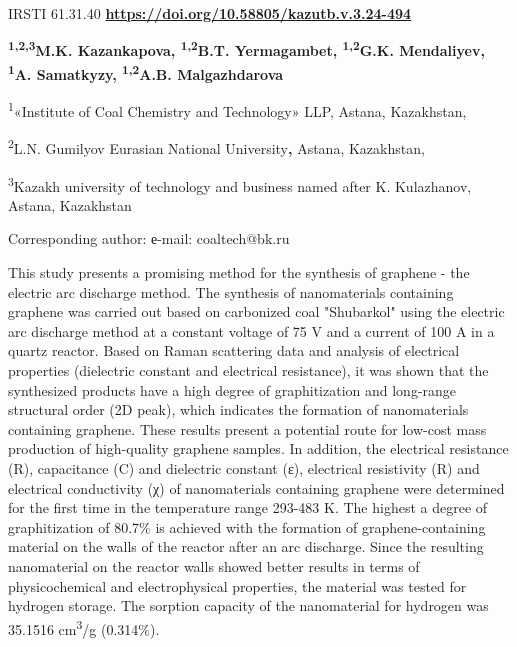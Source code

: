 \newpage
IRSTI 61.31.40
\hfill {\bfseries \href{https://doi.org/10.58805/kazutb.v.3.24-494}{https://doi.org/10.58805/kazutb.v.3.24-494}}


\begin{center}
{\bfseries \textsuperscript{1,2,3}M.K. Kazankapova, \textsuperscript{1,2}B.T. Yermagambet, \textsuperscript{1,2}G.K. Mendaliyev, \textsuperscript{1}A. Samatkyzy, \textsuperscript{1,2}A.B. Malgazhdarova}

\textsuperscript{1}«Institute of Coal Chemistry and Technology» LLP,
Astana, Kazakhstan,

\textsuperscript{2}L.N. Gumilyov Eurasian National University{\bfseries ,}
Astana, Kazakhstan,

\textsuperscript{3}Kazakh university of technology and business named
after K. Kulazhanov, Astana, Kazakhstan

Corresponding author: е-mail: coaltech@bk.ru
\end{center}

This study presents a promising method for the synthesis of graphene -
the electric arc discharge method. The synthesis of nanomaterials
containing graphene was carried out based on carbonized coal "Shubarkol"
using the electric arc discharge method at a constant voltage of 75 V
and a current of 100 A in a quartz reactor. Based on Raman scattering
data and analysis of electrical properties (dielectric constant and
electrical resistance), it was shown that the synthesized products have
a high degree of graphitization and long-range structural order (2D
peak), which indicates the formation of nanomaterials containing
graphene. These results present a potential route for low-cost mass
production of high-quality graphene samples. In addition, the electrical
resistance (R), capacitance (C) and dielectric constant (ε), electrical
resistivity (R) and electrical conductivity (χ) of nanomaterials
containing graphene were determined for the first time in the
temperature range 293-483 K. The highest a degree of graphitization of
80.7\% is achieved with the formation of graphene-containing material on
the walls of the reactor after an arc discharge. Since the resulting
nanomaterial on the reactor walls showed better results in terms of
physicochemical and electrophysical properties, the material was tested
for hydrogen storage. The sorption capacity of the nanomaterial for
hydrogen was 35.1516 cm\textsuperscript{3}/g (0.314\%).


